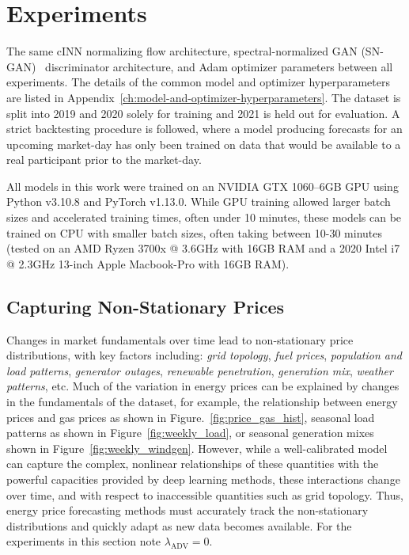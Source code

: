 \chapter{Experiments}\label{ch:experiments}

The same cINN normalizing flow architecture, spectral-normalized GAN (SN-GAN)~\cite{sngan} discriminator architecture, and
Adam optimizer parameters between all experiments.
The details of the common model and optimizer hyperparameters are listed in Appendix~\ref{ch:model-and-optimizer-hyperparameters}.
The dataset is split into 2019 and 2020 solely for training and 2021 is held out for evaluation.
A strict backtesting procedure is followed, where a model producing forecasts for an upcoming market-day has only been
trained on data that would be available to a real participant prior to the market-day.

All models in this work were trained on an NVIDIA GTX 1060--6GB GPU using Python v3.10.8 and PyTorch v1.13.0.
While GPU training allowed larger batch sizes and accelerated training times, often under 10 minutes, these
models can be trained on CPU with smaller batch sizes, often taking between 10-30 minutes (tested on an AMD
Ryzen 3700x @ 3.6GHz with 16GB RAM and a 2020 Intel i7 @ 2.3GHz 13-inch Apple Macbook-Pro with 16GB RAM).

\section{Capturing Non-Stationary Prices}\label{sec:capturing-non-stationary-prices}

Changes in market fundamentals over time lead to non-stationary price distributions, with key factors including:
\textit{grid topology}, \textit{fuel prices}, \textit{population and load patterns}, \textit{generator outages},
\textit{renewable penetration}, \textit{generation mix}, \textit{weather patterns}, etc.
Much of the variation in energy prices can be explained by changes in the fundamentals of the dataset,
for example, the relationship between energy prices and gas prices as shown in Figure.~\ref{fig:price_gas_hist},
seasonal load patterns as shown in Figure~\ref{fig:weekly_load}, or seasonal generation mixes shown in
Figure~\ref{fig:weekly_windgen}.
However, while a well-calibrated model can capture the complex, nonlinear relationships of these quantities with the
powerful capacities provided by deep learning methods, these interactions change over time, and with respect to
inaccessible quantities such as grid topology.
Thus, energy price forecasting methods must accurately track the non-stationary distributions and quickly adapt as
new data becomes available.
For the experiments in this section note $\lambda_{\text{ADV}} = 0$.

